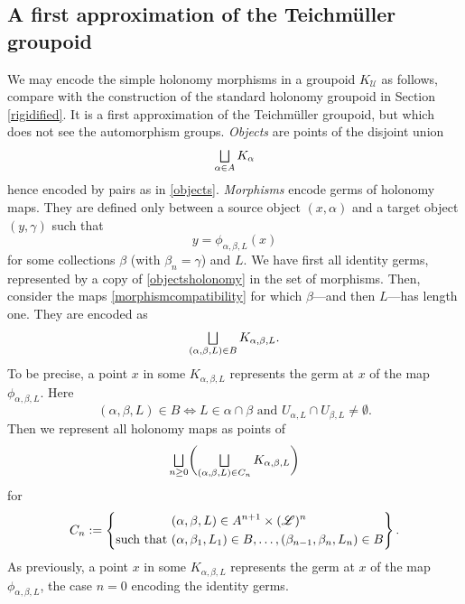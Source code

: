\documentclass[10pt]{amsart}
\let\mathcal\mathscr
\let\oldbigsqcup\bigsqcup
\renewcommand{\bigsqcup}{\mathop{\textstyle\oldbigsqcup}\displaylimits}
\theoremstyle{plain}
\theoremstyle{definition}
\theoremstyle{remark}
\numberwithin{equation}{section}
\let\uniondisjointe\bigsqcup
\begin{document}
\subsection{A first approximation of the Teichmüller groupoid}
\label{firstapp}
We may encode the simple holonomy morphisms in a groupoid $K_\mathcal U$ as follows, compare with the construction of the standard holonomy groupoid in Section \ref{rigidified}. It is a first approximation of the Teichmüller groupoid, but which does not see the automorphism groups. \emph{Objects} are points of the disjoint union
\begin{equation}
\label{objectsholonomy}
\uniondisjointe_{\alpha\in A} K_{\alpha}
\end{equation}
hence encoded by pairs as in \eqref{objects}. \emph{Morphisms} encode germs of holonomy maps. They are defined only between a source object $(x,\alpha)$ and a target object $(y,\gamma)$ such that
\begin{equation}
\label{morphismcompatibility}
y=\phi_{\alpha,\beta, L}(x)
\end{equation}
for some collections $\beta$ (with $\beta_n=\gamma$) and $L$. We have first all identity germs, represented by a copy of \eqref{objectsholonomy} in the set of morphisms. Then, consider the maps \eqref{morphismcompatibility} for which $\beta$---and then $L$---has length one. They are encoded as
\begin{equation}
\label{morphismholonomy1}
\uniondisjointe_{(\alpha,\beta, L) \in B} K_{\alpha,\beta, L}.
\end{equation}
To be precise, a point $x$ in some $K_{\alpha,\beta, L}$ represents the germ at $x$ of the map $\phi_{\alpha,\beta, L}$. Here
\begin{equation}
\label{Bdef}
(\alpha,\beta,L)\in B\iff L\in\alpha\cap\beta\text{ and }U_{\alpha,L}\cap U_{\beta,L}\not=\emptyset.
\end{equation}
Then we represent all holonomy maps as
points of
\begin{equation}
\label{morphismholonomy2}
\uniondisjointe_{n\geq 0}\biggl (\uniondisjointe_{(\alpha,\beta, L) \in C_{n}} K_{\alpha,\beta, L} \biggr )
\end{equation}
for
\begin{equation}
\label{Cn}
C_n:=\left\{
\begin{aligned}
&(\alpha,\beta, L)\in A^{n+1}\times (\mathcal L)^{n}\cr
\text{such that }&(\alpha,\beta_1,L_1)\in B,\hdots, (\beta_{n-1},\beta_n,L_n)\in B
\end{aligned}\hspace*{-10pt}
\right\}.
\end{equation}
As previously, a point $x$ in some $K_{\alpha,\beta, L}$ represents the germ at $x$ of the map $\phi_{\alpha,\beta, L}$, the case $n=0$ encoding the identity
germs.
\end{document}
